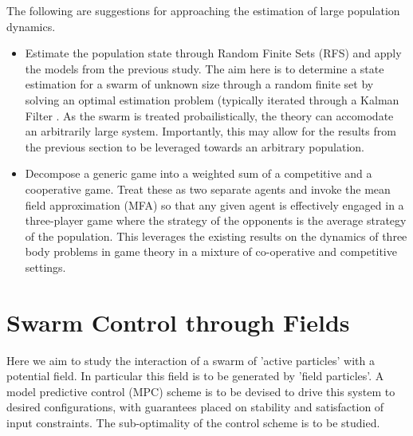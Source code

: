 \documentclass[.../main.tex]{subfiles}
\begin{document}
	The following are suggestions for approaching the estimation of large population dynamics.

	\begin{itemize}
		\item Estimate the population state through Random Finite Sets (RFS) and
	apply the models from the previous study. The aim here is to determine a state
	estimation for a swarm of unknown size through a random finite set by solving
	an optimal estimation problem  (typically iterated through a Kalman Filter
	\cite{Doerr2019}. As the swarm is treated probailistically, the theory can
	accomodate an arbitrarily large system. Importantly, this may allow for the
	results from the previous section to be leveraged towards an arbitrary
	population. 

	\item Decompose a generic game into a weighted sum of a
	competitive and a cooperative game. Treat these as two separate agents and
	invoke the mean field approximation (MFA) so that any given agent is
	effectively engaged in a three-player game where the strategy of the opponents
	is the average strategy of the population. This leverages the existing results
	on the dynamics of three body problems in game theory \cite{Nagarajan2018} in
	a mixture of co-operative and competitive settings.
	\end{itemize}

	


    \section{Swarm Control through Fields} \label{sec::Swarm_Field_Control}

    Here we aim to study the interaction of a swarm of 'active particles' with a potential field. In
    particular this field is to be generated by 'field particles'. A model predictive control 
    (MPC) scheme
    is to be devised to drive this system to desired configurations, with guarantees placed on
    stability and satisfaction of input constraints. The sub-optimality of the control
    scheme is to be studied.
\end{document}
